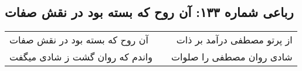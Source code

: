 \begin{center}
\section*{رباعی شماره ۱۳۳: آن روح که بسته بود در نقش صفات}
\label{sec:0133}
\begin{longtable}{l p{0.5cm} r}
آن روح که بسته بود در نقش صفات
&&
از پرتو مصطفی درآمد بر ذات
\\
واندم که روان گشت ز شادی میگفت
&&
شادی روان مصطفی را صلوات
\\
\end{longtable}
\end{center}
